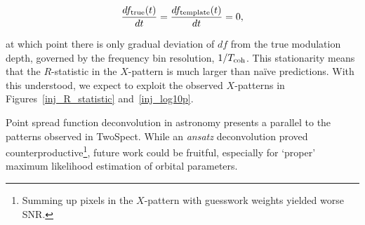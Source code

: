 \begin{equation}
\frac{df_\textup{true} (t)}{dt} = \frac{df_\textup{template}(t)}{dt} = 0,
\end{equation}

\noindent at which point there is only gradual deviation of $df$ from the true modulation depth, governed by the frequency bin resolution, $1/T_\textup{coh}$. 
This stationarity means that the $R$-statistic in the $X$-pattern is much larger than na\"{i}ve predictions.
With this understood, we expect to exploit the observed $X$-patterns in Figures~\ref{inj_R_statistic} and~\ref{inj_log10p}.


Point spread function deconvolution in astronomy presents a parallel to the patterns observed in TwoSpect.
While an \textit{ansatz} deconvolution proved counterproductive\footnote{Summing up pixels in the $X$-pattern with guesswork weights yielded worse SNR.}, future work could be fruitful, especially for `proper' maximum likelihood estimation of orbital parameters.


